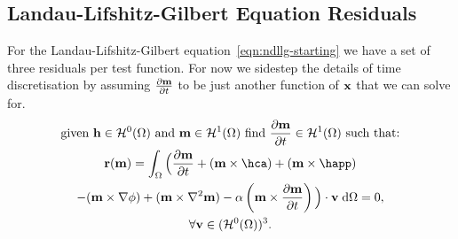 


\subsection{Landau-Lifshitz-Gilbert Equation Residuals}

For the Landau-Lifshitz-Gilbert equation~\eqref{eqn:ndllg-starting} we have a set of three residuals per test function. For now we sidestep the details of time discretisation by assuming $\frac{\partial \mathbf{m}}{\partial t}$ to be just another function of $\mathbf{x}$ that we can solve for.
\begin{gather}
  \text{given $\hv \in \sob^0(\magd)$ and $\mv \in \sob^1(\magd)$ find $\dmdt \in \sob^1(\magd)$ such that:} \notag
  \\
  \rllg(\mv) = \int_\magd \Big( \dmdt
  + (\mv \times \hca) + (\mv \times \happ) \\
  - (\mv \times \nabla \phi) + (\mv \times \lap \mv)
  - \dampc \left( \mv \times \dmdt \right)
  \Big) \cdot \testv \d\magd
  = 0, \label{res:contllg}
  \\
  \forall \testv \in (\sob^0(\magd))^3. \notag
\end{gather}

